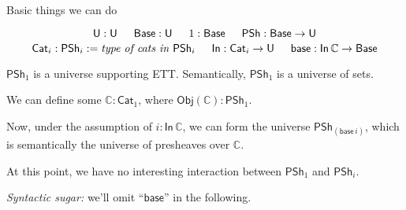 \documentclass[dvipsnames,aspectratio=169]{beamer}
\newcommand{\ms}[1]{\mathsf{#1}}
\newcommand{\mbb}[1]{\mathbb{#1}}
\newcommand{\U}{\mathsf{U}}
\newcommand{\Base}{\mathsf{Base}}
\newcommand{\In}{\mathsf{In}}
\newcommand{\PSh}{\mathsf{PSh}}
\newcommand{\Cat}{\mathsf{Cat}}
\newcommand{\base}{\mathsf{base}}
\newcommand{\mbbC}{\mbb{C}}
\begin{document}
\begin{frame}{Basic things we can do}
\begin{block}{}
\vspace{-0.6em}
{\small
  \[ \U : \U \hspace{1.5em} \Base : \U \hspace{1.5em} 1 : \Base \hspace{1.5em} \PSh : \Base \to \U \]
  \[ \Cat_i : \PSh_i := \text{\emph{type of cats in $\PSh_i$}} \hspace{1.5em} \In : \Cat_i \to \U \hspace{1.5em} \base : \In\,\mbbC \to \Base \]
}
\end{block}
\vspace{1em}

$\PSh_1$ is a universe supporting ETT. Semantically, $\PSh_1$ is a universe of sets.
\vspace{1em}
\pause

We can define some $\mbbC : \Cat_1$, where $\ms{Obj}(\mbbC) : \PSh_1$.
\vspace{1em}
\pause

Now, \alert{under the assumption} of $i : \In\,\mbbC$, we can form the universe $\PSh_{(\base\,i)}$, which is semantically the universe of
presheaves over $\mbbC$.
\vspace{1em}
\pause

At this point, we have no interesting interaction between $\PSh_1$ and $\PSh_i$.
\vspace{1em}

{\small
\emph{Syntactic sugar:} we'll omit ``$\base$'' in the following.
\vspace{3em}
}

\end{frame}
\end{document}
